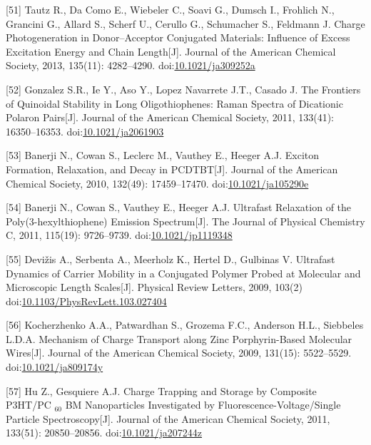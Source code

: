 \documentclass[12pt,]{report}
\begin{document}
{[}51{]} Tautz R., Da Como E., Wiebeler C., Soavi G., Dumsch I.,
Frohlich N., Grancini G., Allard S., Scherf U., Cerullo G., Schumacher
S., Feldmann J. Charge Photogeneration in Donor--Acceptor Conjugated
Materials: Influence of Excess Excitation Energy and Chain
Length{[}J{]}. Journal of the American Chemical Society, 2013, 135(11):
4282--4290.
doi:\href{http://dx.doi.org/10.1021/ja309252a}{10.1021/ja309252a}

{[}52{]} Gonzalez S.R., Ie Y., Aso Y., Lopez Navarrete J.T., Casado J.
The Frontiers of Quinoidal Stability in Long Oligothiophenes: Raman
Spectra of Dicationic Polaron Pairs{[}J{]}. Journal of the American
Chemical Society, 2011, 133(41): 16350--16353.
doi:\href{http://dx.doi.org/10.1021/ja2061903}{10.1021/ja2061903}

{[}53{]} Banerji N., Cowan S., Leclerc M., Vauthey E., Heeger A.J.
Exciton Formation, Relaxation, and Decay in PCDTBT{[}J{]}. Journal of
the American Chemical Society, 2010, 132(49): 17459--17470.
doi:\href{http://dx.doi.org/10.1021/ja105290e}{10.1021/ja105290e}

{[}54{]} Banerji N., Cowan S., Vauthey E., Heeger A.J. Ultrafast
Relaxation of the Poly(3-hexylthiophene) Emission Spectrum{[}J{]}. The
Journal of Physical Chemistry C, 2011, 115(19): 9726--9739.
doi:\href{http://dx.doi.org/10.1021/jp1119348}{10.1021/jp1119348}

{[}55{]} Devižis A., Serbenta A., Meerholz K., Hertel D., Gulbinas V.
Ultrafast Dynamics of Carrier Mobility in a Conjugated Polymer Probed at
Molecular and Microscopic Length Scales{[}J{]}. Physical Review Letters,
2009, 103(2)
doi:\href{http://dx.doi.org/10.1103/PhysRevLett.103.027404}{10.1103/PhysRevLett.103.027404}

{[}56{]} Kocherzhenko A.A., Patwardhan S., Grozema F.C., Anderson H.L.,
Siebbeles L.D.A. Mechanism of Charge Transport along Zinc
Porphyrin-Based Molecular Wires{[}J{]}. Journal of the American Chemical
Society, 2009, 131(15): 5522--5529.
doi:\href{http://dx.doi.org/10.1021/ja809174y}{10.1021/ja809174y}

{[}57{]} Hu Z., Gesquiere A.J. Charge Trapping and Storage by Composite
P3HT/PC \(_{\textrm{60}}\) BM Nanoparticles Investigated by
Fluorescence-Voltage/Single Particle Spectroscopy{[}J{]}. Journal of the
American Chemical Society, 2011, 133(51): 20850--20856.
doi:\href{http://dx.doi.org/10.1021/ja207244z}{10.1021/ja207244z}
\end{document}

